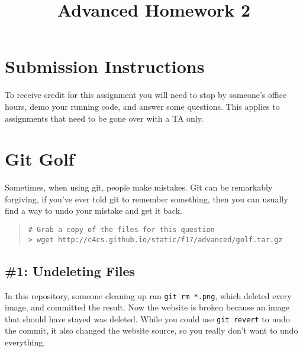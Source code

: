 \documentclass{article}
\begin{document}
\fancyfoot[C]{\color{gray} \thepage~/~\pageref*{LastPage}}
\pagestyle{fancyplain}

\title{\textbf{Advanced Homework 2\\}}
\author{\textbf{\color{red}{Due: Wednesday, September 27th, 11:59PM (Hard Deadline)}}}
\date{}
\maketitle


\section*{Submission Instructions}
To receive credit for this assignment you will need to stop by someone's
office hours, demo your running code, and answer some questions. \textbf{\color{red}{Make sure
to check the office hour schedule as the real due date is at the last office
hours before the date listed above.}} This applies to assignments that need to be gone over with a TA only.


\section{Git Golf}

Sometimes, when using git, people make mistakes. Git can be remarkably
forgiving, if you've ever told git to remember something, then you can usually
find a way to undo your mistake and get it back.

\begin{quote}
\begin{lstlisting}
# Grab a copy of the files for this question
> wget http://c4cs.github.io/static/f17/advanced/golf.tar.gz
\end{lstlisting}
\end{quote}

\subsection*{\#1: Undeleting Files}

In this repository, someone cleaning up ran
\texttt{git~rm~*.png}, which deleted every image, and committed the result.
Now the website is broken because an image that should have stayed was
deleted. While you could use \texttt{git~revert} to undo the commit, it also
changed the website source, so you really don't want to undo everything.
\end{document}
